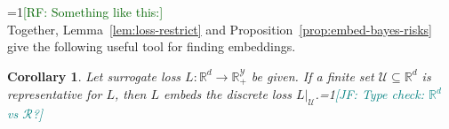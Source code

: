 \documentclass[11pt]{article}
\newcommand{\Comments}{1}
\newcommand{\mynote}[2]{\ifnum\Comments=1\textcolor{#1}{#2}\fi}
\newcommand{\mytodo}[2]{\ifnum\Comments=1%
  \todo[linecolor=#1!80!black,backgroundcolor=#1,bordercolor=#1!80!black]{#2}\fi}
\newcommand{\raf}[1]{\mynote{darkgreen}{[RF: #1]}}
\newcommand{\jessie}[1]{\mynote{teal}{[JF: #1]}}
\newcommand{\btw}[1]{\mytodo{gray!20!white}{BTW: #1}}%
\newcommand{\reals}{\mathbb{R}}
\newcommand{\R}{\mathcal{R}}
\newcommand{\U}{\mathcal{U}}
\newcommand{\Y}{\mathcal{Y}}
\DeclareMathOperator*{\sgn}{sgn}
\newtheorem{corollary}{Corollary}
\begin{document}
\raf{Something like this:}\\
Together, Lemma~\ref{lem:loss-restrict} and Proposition~\ref{prop:embed-bayes-risks} give the following useful tool for finding embeddings.
\begin{corollary}\label{cor:representative-embeds-restriction}
  Let surrogate loss $L:\reals^d \to \reals^\Y_+$ be given.
  If a finite set $\U \subseteq \reals^d$ is representative for $L$, then $L$ embeds the discrete loss $L|_\U$.\jessie{Type check: $\reals^d$ vs $\R$?}
\end{corollary}


\end{document}

